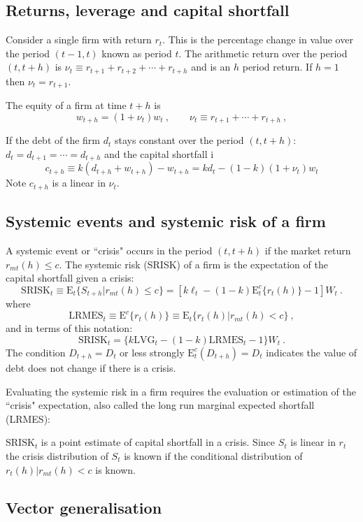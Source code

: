 \documentclass[authoryear]{elsarticle}
\newcommand{\E}{\mathrm{E}}
\newcommand{\cq}{\ , \qquad}
\newcommand{\be}[1]{\begin{equation}\label{#1}}
\newcommand{\ee}{\end{equation}}
\begin{document}
\subsection{Returns, leverage and capital shortfall}

Consider a single firm with return $r_t$.   This is the percentage change in value over the period  $(t-1,t)$ known as period $t$.   The arithmetic return over the period $(t,t+h)$ is $\nu_t\equiv r_{t+1}+r_{t+2}+\cdots+r_{t+h}$ and is an $h$ period return.  If $h=1$ then  $\nu_t=r_{t+1}$. 

The equity of a firm at time $t+h$ is 
$$
w_{t+h} = (1+\nu_{t})w_t\cq \nu_t\equiv r_{t+1}+\cdots+r_{t+h}\ ,
$$

If the debt of the firm $d_t$  stays constant over the period $(t,t+h)$:   $d_t=d_{t+1}=\cdots=d_{t+h}$  and the capital shortfall i 
\be{cs}
c_{t+h}\equiv  k(d_{t+h}+w_{t+h})-w_{t+h} = k d_{t} - (1-k)(1+\nu_{t})w_t
\ee
 Note  $c_{t+h}$ is a linear in $\nu_t$.

\subsection{Systemic events and systemic risk of a firm}
A systemic event or ``crisis"   occurs in the period $(t,t+h)$ if the market  return $r_{mt}(h)\le c$.   The systemic risk (SRISK)  of  a firm is the expectation of the capital shortfall given  a crisis:
\be{sr}
\mathrm{SRISK}_t\equiv  \E_t\{S_{t+h}|r_{mt}(h)\le c\}  =  [k\ell_t-(1-k)\E_t^c\{r_{t}(h)\}-1]W_t\ .
\ee
where
$$
\mathrm{LRMES}_t \equiv \E^c\{r_{t}(h)\}\equiv \E_t\{r_t(h)|r_{mt}(h)<c\}\ ,
$$
and in terms of this notation:
$$ 
 \mathrm{SRISK}_t = \{k\mathrm{LVG}_t - (1-k)\mathrm{LRMES}_t - 1\}W_t\ .
$$
The condition $D_{t+h}=D_t$ or less strongly $\E_t^c(D_{t+h})=D_t$ indicates the value of debt  does not change if there is a crisis.   

Evaluating the systemic risk in a firm requires the evaluation or estimation of the ``crisis" expectation, also called  the long run marginal expected shortfall (LRMES):

$\mathrm{SRISK}_t$ is a point estimate of capital shortfall in a crisis.   Since $S_t$ is linear in $r_t$ the crisis distribution of $S_t$ is known if the conditional distribution of $r_t(h)|r_{mt}(h)<c$ is known.      
 
\subsection{Vector generalisation} 
\end{document}
